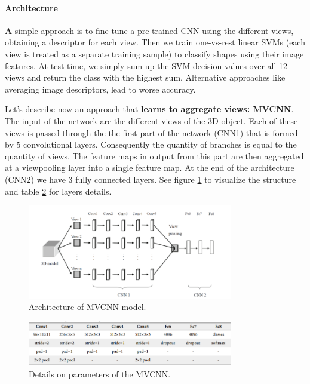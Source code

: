 \paragraph{Architecture}
\textbf A simple approach is to fine-tune a pre-trained CNN using the different views, obtaining a descriptor for each view. Then we train one-vs-rest linear SVMs (each view is treated as a separate training sample) to classify shapes using their image features. At test time, we simply sum up the SVM decision values over all 12 views and return the class with the highest sum. Alternative approaches like averaging image descriptors, lead to worse accuracy.

Let's describe now an approach that  \textbf{learns to aggregate views: MVCNN}. The input of the network are the different views of the 3D object. Each of these views is passed through the the first part of the network (CNN1) that is formed by 5 convolutional layers. Consequently the quantity of branches is equal to the quantity of views. The feature maps in output from this part are then aggregated at a viewpooling layer into a single feature map. At the end of the architecture (CNN2) we have 3 fully connected layers. See figure \ref{fig:mvcnn} to visualize the structure and table \ref{fig:MVCNN_TABLE} for layers details.

\begin{figure}[ht]
    \centering
    \includegraphics[width=0.8\textwidth]{images/mvcnn.png}
    \caption{Architecture of MVCNN model.}
    \label{fig:mvcnn}
\end{figure}

\begin{figure}[ht]
    \centering
    \includegraphics[width=0.8\textwidth]{images/MVCNN_TABLE.png}
    \caption{ Details on parameters of the MVCNN.}
    \label{fig:MVCNN_TABLE}
\end{figure}
\newpage

